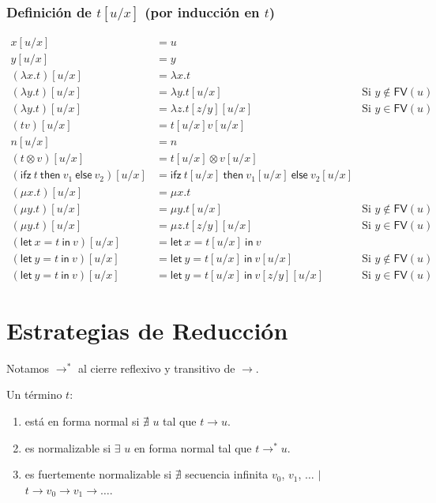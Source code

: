 \documentclass[twoside,a4paper,12pt]{article}
\theoremstyle{definition}
\theoremstyle{remark}
\newcommand\fix[2]{\ensuremath{\mathsf{\mu}#1.#2}}
\newcommand\fun[2]{\ensuremath{\lambda {#1}{.}{#2}}}
\newcommand\FV{\ensuremath{\mathsf{FV}}}
\newcommand\ifz[3]{\ensuremath{\mathsf{ifz~}#1\mathsf{~then~}#2\mathsf{~else~}#3}}
\newcommand\letl[3]{\ensuremath{\mathsf{let~}#1=#2\mathsf{~in~}#3}}
\begin{document}
\newpage
\subsubsection*{Definición de $t[u/x]$ (por inducción en $t$)}

\begin{align*}
  x[u/x] &= u\\
  y[u/x] &= y\\
  (\fun xt)[u/x] &=\fun xt\\
  (\fun yt)[u/x] &=\fun y{t[u/x]} &\textrm{Si }y\notin \FV(u)\\
  (\fun yt)[u/x] &=\fun z{t[z/y]}[u/x] &\textrm{Si }y\in \FV(u)\\
  (tv)[u/x] &= t[u/x]v[u/x]\\
  n[u/x] &=n\\
  (t\otimes v)[u/x] &=t[u/x]\otimes v[u/x]\\
  (\ifz t{v_1}{v_2})[u/x] &=\ifz{t[u/x]}{v_1[u/x]}{v_2[u/x]}\\
  (\fix xt)[u/x] &=\fix xt\\
  (\fix yt)[u/x] &=\fix yt[u/x] &\textrm{Si } y\notin \FV(u)\\
  (\fix yt)[u/x] &=\fix zt[z/y][u/x] &\textrm{Si }y\in \FV(u)\\
  (\letl xtv)[u/x] &=\letl x{t[u/x]}v\\
  (\letl ytv)[u/x] &=\letl y{t[u/x]}{v[u/x]} &\textrm{Si }y\notin \FV(u)\\
  (\letl ytv)[u/x] &=\letl y{t[u/x]}{v[z/y][u/x]} &\textrm{Si }y\in \FV(u)
\end{align*}

\newpage
\section*{Estrategias de Reducción}

\begin{definicion}{3.1}
  Notamos $\to^*$ al cierre reflexivo y transitivo de $\to$.
\end{definicion}

\begin{definicion}{3.3}
  Un término $t$:
  \begin{enumerate}
  \item está en forma normal si $\nexists$ $u$ tal que $t \to u$.
  \item es normalizable si $\exists$ $u$ en forma normal tal que $t \to^*u$.
  \item es fuertemente normalizable si $\nexists$ secuencia
    infinita $v_0$, $v_1$, $\dots$ $|$ $t\to v_0\to v_1\to\dots$.
  \end{enumerate}
\end{definicion}
\end{document}
